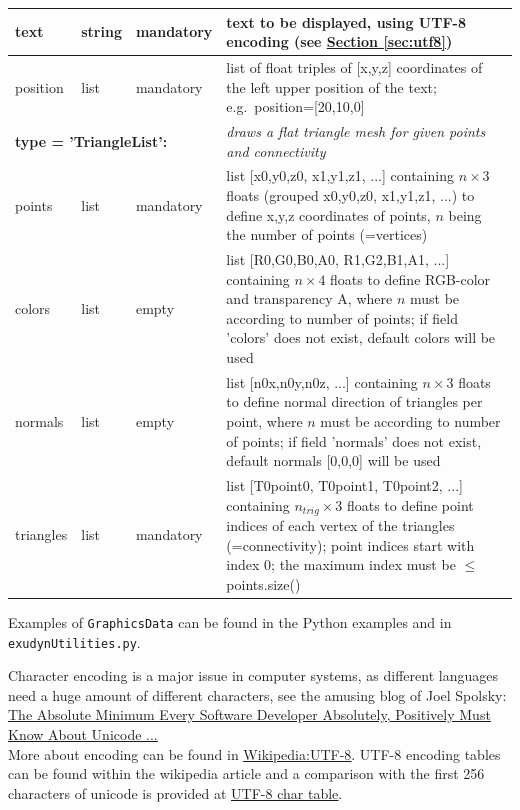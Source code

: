 \documentclass[11pt,a4paper]{book}
\newcommand{\exuUrl}[2]{\href{#1}{\underline{#2}}} %
\newcommand{\refSection}[1]{\hyperref[#1]{\underline{Section \ref*{#1}}}} %
\begin{document}
\begin{center}
\begin{longtable}{| p{3cm} | p{2cm} | p{3cm} | p{7.5cm} |}
  text & string & mandatory & text to be displayed, using UTF-8 encoding (see \refSection{sec:utf8})\\ \hline
  position & list & mandatory & list of float triples of [x,y,z] coordinates of the left upper position of the text; e.g.\ position=[20,10,0] \\ \hline
	\multicolumn{3}{l}{\parbox{8cm}{\bf type = 'TriangleList': }} & \multicolumn{1}{l}{\parbox{7.5cm}{\it draws a flat triangle mesh for given points and connectivity}}\\ \hline
  points & list & mandatory & list [x0,y0,z0, x1,y1,z1, ...] containing $n \times 3$ floats (grouped x0,y0,z0, x1,y1,z1, ...) to define x,y,z coordinates of points, $n$ being the number of points (=vertices)\\ \hline
  colors & list & empty & list [R0,G0,B0,A0, R1,G2,B1,A1, ...] containing $n \times 4$ floats to define RGB-color and transparency A, where $n$ must be according to number of points; if field 'colors' does not exist, default colors will be used\\ \hline
  normals & list & empty & list [n0x,n0y,n0z, ...] containing $n \times 3$ floats to define normal direction of triangles per point, where $n$ must be according to number of points; if field 'normals' does not exist, default normals [0,0,0] will be used\\ \hline
  triangles & list &  mandatory & list [T0point0, T0point1, T0point2, ...] containing $n_{trig} \times 3$ floats to define point indices of each vertex of the triangles (=connectivity); point indices start with index 0; the maximum index must be $\le$ points.size()\\ \hline
\end{longtable}
%
\end{center}
%
Examples of \texttt{GraphicsData} can be found in the Python examples and in \texttt{exudynUtilities.py}.

\label{sec:utf8}
Character encoding is a major issue in computer systems, as different languages need a huge amount of different characters,
see the amusing blog of Joel Spolsky:\\
\exuUrl{https://www.joelonsoftware.com/2003/10/08/the-absolute-minimum-every-software-developer-absolutely-positively-must-know-about-unicode-and-character-sets-no-excuses/}{The Absolute Minimum Every Software Developer Absolutely, Positively Must Know About Unicode ...}\\
More about encoding can be found in \exuUrl{https://en.wikipedia.org/wiki/UTF-8}{Wikipedia:UTF-8}. UTF-8 encoding tables can be found within the wikipedia article and a comparison with the first 256 characters of unicode is provided at \exuUrl{https://www.utf8-chartable.de/}{UTF-8 char table}.
\end{document}
